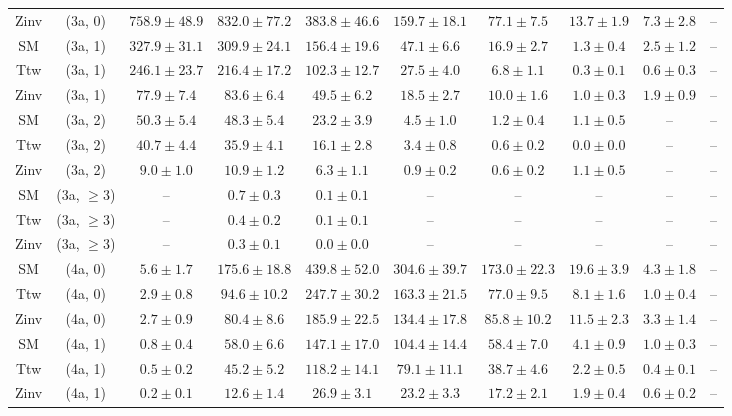 \begin{table}[h!]
{\begin{tabular}{cccccccccc}
	Zinv & (3a, 0) & $758.9\pm 48.9$ & $832.0\pm 77.2$ & $383.8\pm 46.6$ & $159.7\pm 18.1$ & $77.1\pm 7.5$ & $13.7\pm 1.9$ & $7.3\pm 2.8$ & -- \\[0.5ex] 
	SM & (3a, 1) & $327.9\pm 31.1$ & $309.9\pm 24.1$ & $156.4\pm 19.6$ & $47.1\pm 6.6$ & $16.9\pm 2.7$ & $1.3\pm 0.4$ & $2.5\pm 1.2$ & -- \\[0.5ex] 
	Ttw & (3a, 1) & $246.1\pm 23.7$ & $216.4\pm 17.2$ & $102.3\pm 12.7$ & $27.5\pm 4.0$ & $6.8\pm 1.1$ & $0.3\pm 0.1$ & $0.6\pm 0.3$ & -- \\[0.5ex] 
	Zinv & (3a, 1) & $77.9\pm 7.4$ & $83.6\pm 6.4$ & $49.5\pm 6.2$ & $18.5\pm 2.7$ & $10.0\pm 1.6$ & $1.0\pm 0.3$ & $1.9\pm 0.9$ & -- \\[0.5ex] 
	SM & (3a, 2) & $50.3\pm 5.4$ & $48.3\pm 5.4$ & $23.2\pm 3.9$ & $4.5\pm 1.0$ & $1.2\pm 0.4$ & $1.1\pm 0.5$ & -- & -- \\[0.5ex] 
	Ttw & (3a, 2) & $40.7\pm 4.4$ & $35.9\pm 4.1$ & $16.1\pm 2.8$ & $3.4\pm 0.8$ & $0.6\pm 0.2$ & $0.0\pm 0.0$ & -- & -- \\[0.5ex] 
	Zinv & (3a, 2) & $9.0\pm 1.0$ & $10.9\pm 1.2$ & $6.3\pm 1.1$ & $0.9\pm 0.2$ & $0.6\pm 0.2$ & $1.1\pm 0.5$ & -- & -- \\[0.5ex] 
	SM & (3a, $\ge3$) & -- & $0.7\pm 0.3$ & $0.1\pm 0.1$ & -- & -- & -- & -- & -- \\[0.5ex] 
	Ttw & (3a, $\ge3$) & -- & $0.4\pm 0.2$ & $0.1\pm 0.1$ & -- & -- & -- & -- & -- \\[0.5ex] 
	Zinv & (3a, $\ge3$) & -- & $0.3\pm 0.1$ & $0.0\pm 0.0$ & -- & -- & -- & -- & -- \\[0.5ex] 
	SM & (4a, 0) & $5.6\pm 1.7$ & $175.6\pm 18.8$ & $439.8\pm 52.0$ & $304.6\pm 39.7$ & $173.0\pm 22.3$ & $19.6\pm 3.9$ & $4.3\pm 1.8$ & -- \\[0.5ex] 
	Ttw & (4a, 0) & $2.9\pm 0.8$ & $94.6\pm 10.2$ & $247.7\pm 30.2$ & $163.3\pm 21.5$ & $77.0\pm 9.5$ & $8.1\pm 1.6$ & $1.0\pm 0.4$ & -- \\[0.5ex] 
	Zinv & (4a, 0) & $2.7\pm 0.9$ & $80.4\pm 8.6$ & $185.9\pm 22.5$ & $134.4\pm 17.8$ & $85.8\pm 10.2$ & $11.5\pm 2.3$ & $3.3\pm 1.4$ & -- \\[0.5ex] 
	SM & (4a, 1) & $0.8\pm 0.4$ & $58.0\pm 6.6$ & $147.1\pm 17.0$ & $104.4\pm 14.4$ & $58.4\pm 7.0$ & $4.1\pm 0.9$ & $1.0\pm 0.3$ & -- \\[0.5ex] 
	Ttw & (4a, 1) & $0.5\pm 0.2$ & $45.2\pm 5.2$ & $118.2\pm 14.1$ & $79.1\pm 11.1$ & $38.7\pm 4.6$ & $2.2\pm 0.5$ & $0.4\pm 0.1$ & -- \\[0.5ex] 
	Zinv & (4a, 1) & $0.2\pm 0.1$ & $12.6\pm 1.4$ & $26.9\pm 3.1$ & $23.2\pm 3.3$ & $17.2\pm 2.1$ & $1.9\pm 0.4$ & $0.6\pm 0.2$ & -- \\[0.5ex] 

\end{tabular}}
\end{table}
